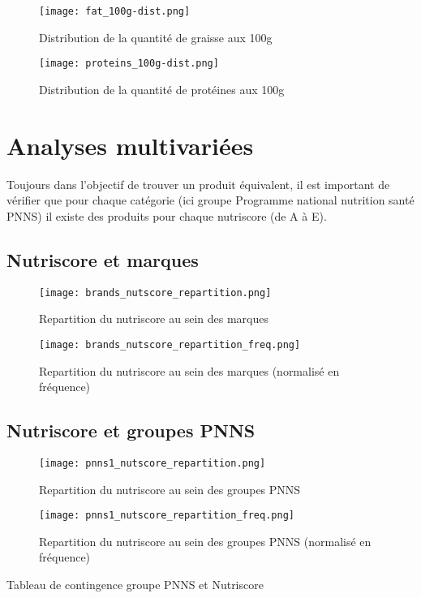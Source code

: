   \begin{figure}[H]
    \texttt{[image: fat\_100g-dist.png]}
    \caption{Distribution de la quantité de graisse aux 100g}
    \label{}
  \end{figure}
  \begin{figure}[H]
    \texttt{[image: proteins\_100g-dist.png]}
    \caption{Distribution de la quantité de protéines aux 100g}
    \label{}
  \end{figure}


\section{Analyses multivariées}
Toujours dans l'objectif de trouver un produit équivalent, il est important
de vérifier que pour chaque catégorie (ici groupe Programme national nutrition santé PNNS)
il existe des produits pour chaque nutriscore (de A à E).

  \subsection{Nutriscore et marques}
    \begin{figure}[H]
      \texttt{[image: brands\_nutscore\_repartition.png]}
      \caption{Repartition du nutriscore au sein des marques}
      \label{}
    \end{figure}
    \begin{figure}[H]
      \texttt{[image: brands\_nutscore\_repartition\_freq.png]}
      \caption{Repartition du nutriscore au sein des marques (normalisé en fréquence)}
      \label{}
    \end{figure}

  \subsection{Nutriscore et groupes PNNS}
  \begin{figure}[H]
    \texttt{[image: pnns1\_nutscore\_repartition.png]}
    \caption{Repartition du nutriscore au sein des groupes PNNS}
    \label{}
  \end{figure}
  \begin{figure}[H]
    \texttt{[image: pnns1\_nutscore\_repartition\_freq.png]}
    \caption{Repartition du nutriscore au sein des groupes PNNS (normalisé en fréquence)}
    \label{}
  \end{figure}

  \begin{table}[H]
    \footnotesize\setlength{\tabcolsep}{2.5pt}
    \caption{Tableau de contingence groupe PNNS et Nutriscore}
    \label{}
    
  \end{table}

